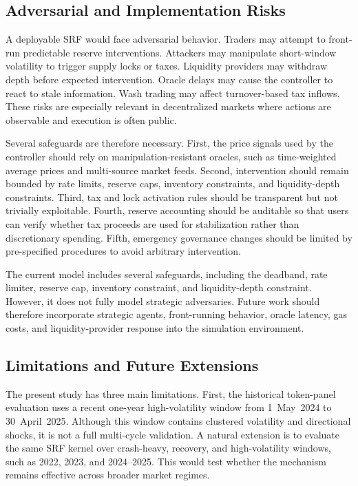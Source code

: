 \documentclass[a4paper,fleqn]{cas-dc}
\begin{document}
\subsection{Adversarial and Implementation Risks}
\label{subsec:discussion_adversarial}

A deployable SRF would face adversarial behavior. Traders may attempt to front-run predictable reserve interventions. Attackers may manipulate short-window volatility to trigger supply locks or taxes. Liquidity providers may withdraw depth before expected intervention. Oracle delays may cause the controller to react to stale information. Wash trading may affect turnover-based tax inflows. These risks are especially relevant in decentralized markets where actions are observable and execution is often public.

Several safeguards are therefore necessary. First, the price signals used by the controller should rely on manipulation-resistant oracles, such as time-weighted average prices and multi-source market feeds. Second, intervention should remain bounded by rate limits, reserve caps, inventory constraints, and liquidity-depth constraints. Third, tax and lock activation rules should be transparent but not trivially exploitable. Fourth, reserve accounting should be auditable so that users can verify whether tax proceeds are used for stabilization rather than discretionary spending. Fifth, emergency governance changes should be limited by pre-specified procedures to avoid arbitrary intervention.

The current model includes several safeguards, including the deadband, rate limiter, reserve cap, inventory constraint, and liquidity-depth constraint. However, it does not fully model strategic adversaries. Future work should therefore incorporate strategic agents, front-running behavior, oracle latency, gas costs, and liquidity-provider response into the simulation environment.

\subsection{Limitations and Future Extensions}
\label{subsec:discussion_limitations}

The present study has three main limitations. First, the historical token-panel evaluation uses a recent one-year high-volatility window from 1~May~2024 to 30~April~2025. Although this window contains clustered volatility and directional shocks, it is not a full multi-cycle validation. A natural extension is to evaluate the same SRF kernel over crash-heavy, recovery, and high-volatility windows, such as 2022, 2023, and 2024--2025. This would test whether the mechanism remains effective across broader market regimes.
\end{document}
